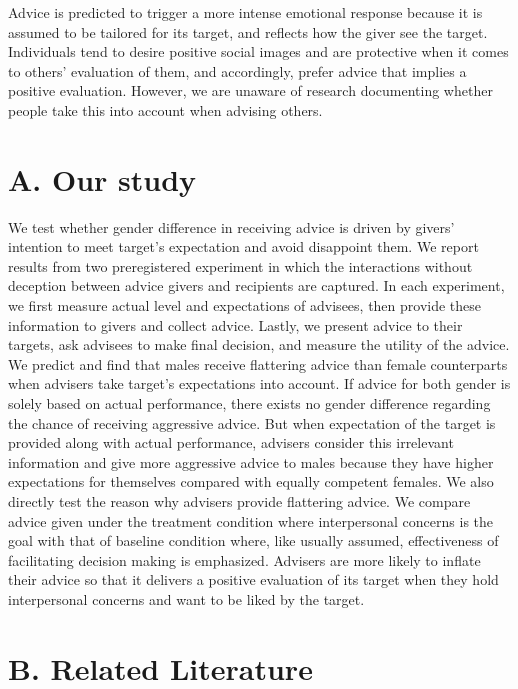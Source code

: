 \documentclass[
  man,floatsintext]{apa6}
\begin{document}
Advice is predicted to trigger a more intense emotional response because it is assumed to be tailored for its target, and reflects how the giver see the target. Individuals tend to desire positive social images and are protective when it comes to others' evaluation of them, and accordingly, prefer advice that implies a positive evaluation. However, we are unaware of research documenting whether people take this into account when advising others.

\hypertarget{a.-our-study}{%
\section{A. Our study}\label{a.-our-study}}

We test whether gender difference in receiving advice is driven by givers' intention to meet target's expectation and avoid disappoint them. We report results from two preregistered experiment in which the interactions without deception between advice givers and recipients are captured. In each experiment, we first measure actual level and expectations of advisees, then provide these information to givers and collect advice. Lastly, we present advice to their targets, ask advisees to make final decision, and measure the utility of the advice.
We predict and find that males receive flattering advice than female counterparts when advisers take target's expectations into account. If advice for both gender is solely based on actual performance, there exists no gender difference regarding the chance of receiving aggressive advice. But when expectation of the target is provided along with actual performance, advisers consider this irrelevant information and give more aggressive advice to males because they have higher expectations for themselves compared with equally competent females.
We also directly test the reason why advisers provide flattering advice. We compare advice given under the treatment condition where interpersonal concerns is the goal with that of baseline condition where, like usually assumed, effectiveness of facilitating decision making is emphasized. Advisers are more likely to inflate their advice so that it delivers a positive evaluation of its target when they hold interpersonal concerns and want to be liked by the target.

\hypertarget{b.-related-literature}{%
\section{B. Related Literature}\label{b.-related-literature}}
\end{document}
